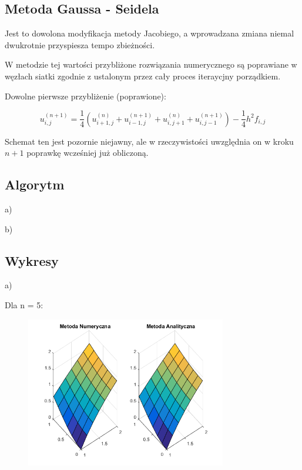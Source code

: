 \newpage
\subsection{Metoda Gaussa - Seidela	}

Jest to dowolona modyfikacja metody Jacobiego, a wprowadzana zmiana niemal dwukrotnie przyspiesza tempo zbieżności.

W metodzie tej wartości przybliżone rozwiązania numerycznego są poprawiane w węzłach siatki zgodnie z ustalonym przez cały proces iteraycjny porządkiem.

Dowolne pierwsze przybliżenie (poprawione):

$$u_{i,j}^{(n+1)} = \frac{1}{4}(u_{i+1,j}^{(n)} + u_{i-1,j}^{(n+1)} + u_{i,j+1}^{(n)} + u_{i,j-1}^{(n+1)}) - \frac{1}{4}h^2f_{i,j}$$

Schemat ten jest pozornie niejawny, ale w rzeczywistości uwzględnia on w kroku $n+1$ poprawkę wcześniej już obliczoną.
\newpage
\subsection{Algorytm}

a)


\newpage
b)


\newpage
\subsection{Wykresy}

a)

Dla n = 5:

\begin{figure}[!ht]
	\begin{center}
		\includegraphics[width=0.78\textwidth]{Lab6/charts/gs/zad1/5.png}
	\end{center}
\end{figure}

